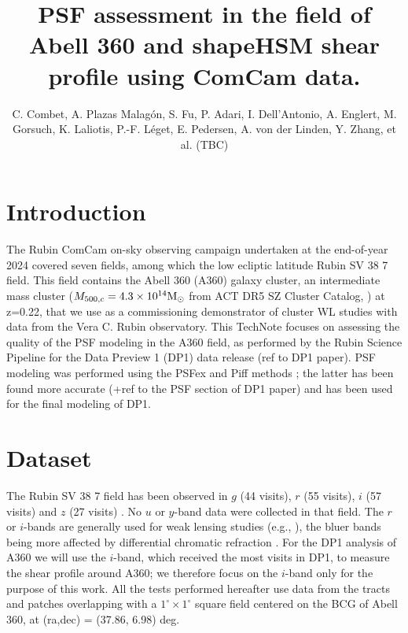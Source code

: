 \documentclass[SE,lsstdraft,authoryear,toc]{lsstdoc}
\title{PSF assessment in the field of Abell 360 and shapeHSM shear profile using ComCam data.}
\author{%
C. Combet, A. Plazas Malagón, S. Fu, P. Adari, I. Dell'Antonio, A. Englert, M. Gorsuch, K. Laliotis, P.-F. Léget, E. Pedersen, A. von der Linden, Y. Zhang, et al. (TBC) 
}
\date{\vcsDate}
\begin{document}
\maketitle


\section{Introduction}
The Rubin ComCam on-sky observing campaign \citep{RTN-095,SITCOMTN-149} 
undertaken at the end-of-year 2024 covered seven fields, among which the low ecliptic latitude Rubin SV 38 7 field. This field contains the Abell 360 (A360) galaxy cluster, an intermediate mass cluster ($M_{500,c} = 4.3\times 10^{14} \rm{M}_\odot$ from ACT DR5 SZ Cluster Catalog, \citealp{2021ApJS..253....3H}) at z=0.22, that we use as a commissioning demonstrator of cluster WL studies with data from the Vera C. Rubin observatory. This TechNote focuses on assessing the quality of the PSF modeling in the A360 field, as performed by the Rubin Science Pipeline for the Data Preview 1 (DP1) data release (ref to DP1 paper). PSF modeling was performed using the PSFex \citep{2011ASPC..442..435B} and Piff methods \citep{2021MNRAS.501.1282J}; the latter has been found more accurate \citep{RTN-095,SITCOMTN-149}(+ref to the PSF section of DP1 paper) and has been used for the final modeling of DP1.

\section{Dataset}
The Rubin SV 38 7 field has been observed in $g$ (44 visits), $r$ (55 visits), $i$ (57 visits) and $z$ (27 visits) \citep{RTN-095,SITCOMTN-149}. No $u$ or $y$-band data were collected in that field. The $r$ or $i$-bands are generally used for weak lensing studies (e.g., \citealp{2018MNRAS.481.3170M}), the bluer bands being more affected by differential chromatic refraction \citep{DMTN-017}. For the DP1 analysis of A360 we will use the $i$-band, which received the most visits in DP1, to measure the shear profile around A360; we therefore focus on the $i$-band only for the purpose of this work. All the tests performed hereafter use data from the tracts and patches overlapping with  a $1^\circ \times 1^\circ$ square field centered on the BCG of Abell 360, at (ra,dec) = (37.86, 6.98) deg. 
\end{document}
